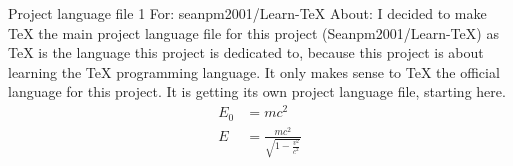 \documentclass{article} %
\title{\ProjectLanguageFile} %
\begin{document}
  \maketitle
  \1 Project language file 1
  \2 For: seanpm2001/Learn-TeX
  \3 About:
  \4 I decided to make TeX the main project language file for this project (Seanpm2001/Learn-TeX) as TeX is the language this project is dedicated to, because this project is about learning the TeX programming language. It only makes sense to TeX the official language for this project. It is getting its own project language file, starting here.
  \begin{align}
    E_0 &= mc^2 \\
    E &= \frac{mc^2}{\sqrt{1-\frac{v^2}{c^2}}}
  \end{align} 
\end{document}
